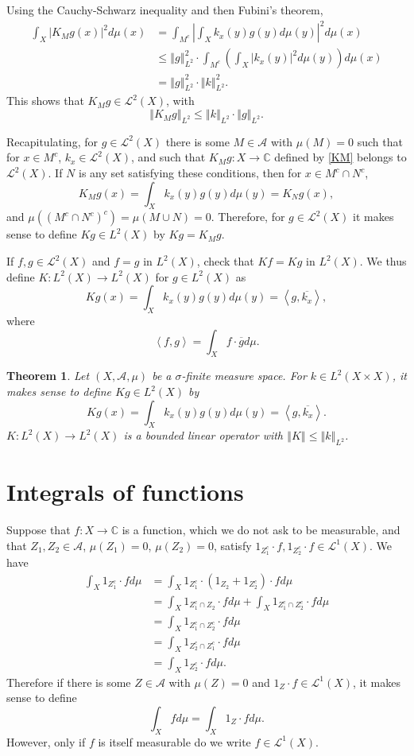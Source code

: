 \documentclass{article}
\newcommand{\inner}[2]{\left\langle #1, #2 \right\rangle}
\newcommand{\norm}[1]{\left\Vert #1 \right\Vert}
\newtheorem{theorem}{Theorem}
\theoremstyle{definition}
\begin{document}
Using the Cauchy-Schwarz inequality and then Fubini's theorem,
\begin{align*}
\int_X |K_M g(x)|^2 d\mu(x)&=\int_{M^c} \left| \int_X k_x(y) g(y) d\mu(y) \right|^2 d\mu(x)\\
&\leq \norm{g}_{L^2}^2 \cdot \int_{M^c} \left( \int_X |k_x(y)|^2 d\mu(y) \right) d\mu(x)\\
&=\norm{g}_{L^2}^2 \cdot \norm{k}_{L^2}^2.
\end{align*}
This shows that $K_M g \in \mathscr{L}^2(X)$, with
\[
\norm{K_M g}_{L^2} \leq \norm{k}_{L^2} \cdot \norm{g}_{L^2}.
\]

 

Recapitulating, for $g \in \mathscr{L}^2(X)$ there is some $M \in \mathscr{A}$ with
$\mu(M)=0$ such that for $x \in M^c$, 
$k_x \in \mathscr{L}^2(X)$, and such that 
$K_M g:X \to \mathbb{C}$ defined by \eqref{KM} 
belongs to $\mathscr{L}^2(X)$. If $N$ is any set satisfying these conditions,
then for $x \in M^c \cap N^c$, 
\[
K_M g(x) = 
\int_X k_x(y) g(y) d\mu(y)
=K_N g(x),
\]
and $\mu((M^c \cap N^c)^c) = \mu(M \cup N)=0$. 
Therefore, for $g \in \mathscr{L}^2(X)$ it makes sense to define $Kg \in L^2(X)$
by $Kg = K_Mg$. 

If $f,g \in \mathscr{L}^2(X)$ and $f=g$ in $L^2(X)$, check that
$Kf=Kg$ in $L^2(X)$. We  thus define
$K:L^2(X) \to L^2(X)$ for $g \in L^2(X)$ as
\[
Kg(x) =\int_X k_x(y) g(y) d\mu(y)= \inner{g}{\overline{k_x}},
\]
where
\[
\inner{f}{g} = \int_X f \cdot \overline{g} d\mu.
\]

\begin{theorem}
Let $(X,\mathscr{A},\mu)$ be a $\sigma$-finite measure space. For $k \in L^2(X \times X)$, it makes sense to define
$Kg \in L^2(X)$ by
\[
Kg(x) = \int_X k_x(y) g(y) d\mu(y) = \inner{g}{\overline{k_x}}.
\]
$K:L^2(X) \to L^2(X)$ is a bounded linear operator with $\norm{K} \leq \norm{k}_{L^2}$.
\end{theorem}


\section{Integrals of functions}
Suppose that $f:X \to \mathbb{C}$ is a function, which we do not ask to be measurable, and 
that $Z_1,Z_2 \in \mathscr{A}$, $\mu(Z_1)=0$, $\mu(Z_2)=0$, satisfy $1_{Z_1^c} \cdot f,
1_{Z_2^c} \cdot f \in \mathscr{L}^1(X)$. 
We have 
\begin{align*}
\int_X 1_{Z_1^c} \cdot f  d\mu &= \int_X 1_{Z_1^c}\cdot (1_{Z_2}+1_{Z_2^c}) \cdot f d\mu\\
&=\int_X 1_{Z_1^c \cap Z_2}\cdot fd\mu + \int_X 1_{Z_1^c \cap Z_2^c} \cdot f d\mu\\
&= \int_X 1_{Z_1^c \cap Z_2^c} \cdot f d\mu\\
&=\int_X 1_{Z_2^c \cap Z_1^c} \cdot f d\mu\\
&=\int_X 1_{Z_2^c} \cdot f d\mu.
\end{align*}
Therefore if there is some $Z \in \mathscr{A}$ with $\mu(Z)=0$ and $1_Z \cdot f \in \mathscr{L}^1(X)$, 
it makes sense to define
\[
\int_X f d\mu = \int_X 1_Z\cdot f d\mu.
\]
However, only if $f$ is itself measurable do we write $f \in \mathscr{L}^1(X)$.
\end{document}
